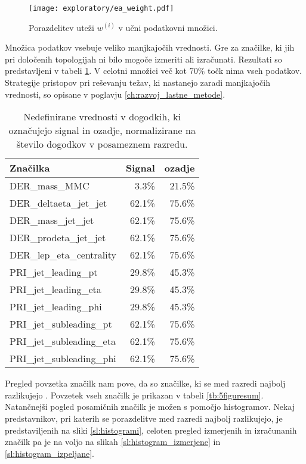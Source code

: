 \documentclass[11pt,a4paper,openany]{book}
\begin{document}
\begin{figure}[ht]
	\centering
	\texttt{[image: exploratory/ea\_weight.pdf]} 
	\caption{Porazdelitev uteži $w^{(i)}$ v učni podatkovni množici.}
	\label{sl:weight}		
\end{figure}

Množica podatkov vsebuje veliko manjkajočih vrednosti. Gre za značilke, ki jih pri določenih topologijah ni bilo mogoče izmeriti ali izračunati. Rezultati so predstavljeni v tabeli \ref{tb:manjkajoce_vrednosti}. V celotni množici več kot $70\%$ točk nima vseh podatkov. Strategije pristopov pri reševanju težav, ki nastanejo zaradi manjkajočih vrednosti, so opisane v poglavju \ref{ch:razvoj_lastne_metode}.

\begin{table}[ht]
	\centering
	\begin{tabular}{lrr}
		\hline
		\textbf{Značilka} &         \textbf{Signal} &         \textbf{ozadje} \\
		\hline
		DER\_mass\_MMC            &  3.3\%  &  21.5\% \\
		DER\_deltaeta\_jet\_jet   &  62.1\% &  75.6\% \\
		DER\_mass\_jet\_jet       &  62.1\% &  75.6\% \\
		DER\_prodeta\_jet\_jet    &  62.1\% &  75.6\% \\
		DER\_lep\_eta\_centrality &  62.1\% &  75.6\% \\
		PRI\_jet\_leading\_pt     &  29.8\% &  45.3\% \\
		PRI\_jet\_leading\_eta    &  29.8\% &  45.3\% \\
		PRI\_jet\_leading\_phi    &  29.8\% &  45.3\% \\
		PRI\_jet\_subleading\_pt  &  62.1\% &  75.6\% \\
		PRI\_jet\_subleading\_eta &  62.1\% &  75.6\% \\
		PRI\_jet\_subleading\_phi &  62.1\% &  75.6\% \\
	\end{tabular}
	\caption{Nedefinirane vrednosti v dogodkih, ki označujejo signal in ozadje, normalizirane na število dogodkov v posameznem razredu.}
	\label{tb:manjkajoce_vrednosti}
\end{table}

Pregled povzetka značilk nam pove, da so značilke, ki se med razredi najbolj razlikujejo . Povzetek vseh značilk je prikazan v tabeli \ref{tb:5figuresum}. Natančnejši pogled posamičnih značilk je možen s pomočjo histogramov. Nekaj predstavnikov, pri katerih se porazdelitve med razredi najbolj razlikujejo, je predstaviljenih na sliki \ref{sl:histogrami}, celoten pregled izmerjenih in izračunanih značilk pa je na voljo na slikah \ref{sl:histogram_izmerjene} in \ref{sl:histogram_izpeljane}.
\end{document}

